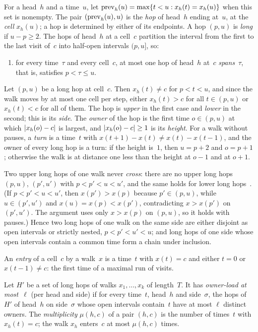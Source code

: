 For a head~$h$ and a time~$u$, let $\mathrm{prev}_h(u)=\max\{t<u:x_h(t)=x_h(u)\}$ when this set is nonempty. The pair
$(\mathrm{prev}_h(u),u)$ is the \emph{hop} of head~$h$ ending at~$u$, at the \emph{cell} $x_h(u)$; a hop is determined by either
of its endpoints. A hop $(p,u)$ is \emph{long} if $u-p\ge2$. The hops of head~$h$ at a cell~$c$ partition the interval
from the first to the last visit of~$c$ into half-open intervals $(p,u]$, so:
\begin{enumerate}[label=(P\arabic*)]
\item for every time~$\tau$ and every cell~$c$, at most one hop of head~$h$ at~$c$ \emph{spans}~$\tau$, that
is, satisfies $p<\tau\le u$.
\end{enumerate}
Let $(p,u)$ be a long hop at cell~$c$. Then $x_h(t)\ne c$ for $p<t<u$, and since the walk moves by at most one cell per step,
either $x_h(t)>c$ for all $t\in(p,u)$ or $x_h(t)<c$ for all of them. The hop is \emph{upper} in the first case and
\emph{lower} in the second; this is its \emph{side}. The \emph{owner} of the hop is the first time $o\in(p,u)$ at which
$\lvert x_h(o)-c \rvert$ is largest, and $\lvert x_h(o)-c \rvert\ge1$ is its \emph{height}. For a walk without pauses, a \emph{turn} is a
time~$t$ with $x(t+1)-x(t)\ne x(t)-x(t-1)$, and the owner of every long hop is a turn: if the height is~$1$, then
$u=p+2$ and $o=p+1$; otherwise the walk is at distance one less than the height at $o-1$ and at $o+1$.

Two upper long hops of one walk never \emph{cross}: there are no upper long hops $(p,u)$, $(p',u')$ with
$p<p'<u<u'$, and the same holds for lower long hops~\cite[Section~5.1]{FourthPaper2026}. (If $p<p'<u<u'$, then
$x(p')>x(p)$ because $p'\in(p,u)$, while $u\in(p',u')$ and $x(u)=x(p)<x(p')$, contradicting $x>x(p')$ on $(p',u')$.
The argument uses only $x>x(p)$ on $(p,u)$, so it holds with pauses.) Hence two long hops of one walk on the same side
are either disjoint as open intervals or strictly nested, $p<p'<u'<u$; and long hops of one side whose open intervals
contain a common time form a chain under inclusion.

\begin{definition}[Entries]\label{def:entries}
An \emph{entry} of a cell~$c$ by a walk~$x$ is a time~$t$ with $x(t)=c$ and either $t=0$ or $x(t-1)\ne c$: the first time
of a maximal run of visits.
\end{definition}

\begin{definition}\label{def:owner-load}
Let $H'$ be a set of long hops of walks $x_1,\dots,x_k$ of length~$T$. It has \emph{owner-load at most~$\ell$} (per head
and side) if for every time~$t$, head~$h$ and side~$\sigma$, the hops of~$H'$ of head~$h$ on side~$\sigma$ whose open
intervals contain~$t$ have at most $\ell$ distinct owners. The \emph{multiplicity} $\mu(h,c)$ of a pair $(h,c)$ is the
number of times~$t$ with $x_h(t)=c$; the walk $x_h$ enters~$c$ at most $\mu(h,c)$ times.
\end{definition}

